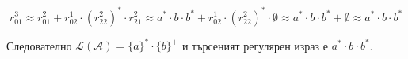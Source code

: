 \documentclass[12pt]{article}
\begin{document}
\[r_{01}^{3} \approx r_{01}^2 + r_{02}^1 \cdot (r_{22}^2)^* \cdot r_{21}^2 \approx a^* \cdot b \cdot b^* + r_{02}^1 \cdot (r_{22}^2)^* \cdot \emptyset \approx a^* \cdot b \cdot b^* + \emptyset \approx  a^* \cdot b \cdot b^*\]

Следователно \(\mathcal{L}(\mathcal{A}) =  \{a\}^* \cdot \{b\}^+\) и търсеният регулярен израз е \(a^* \cdot b \cdot b^*\).
\end{document}
